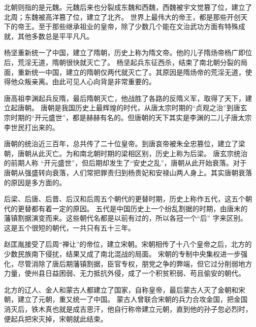\documentclass[avery5371,grid]{flashcards}
\begin{document}
{北朝则指的是元魏。元魏后来也分裂成东魏和西魏，西魏被宇文觉篡了位，建立了北周；东魏被高洋篡了位，建立了北齐。} %
{世界上最伟大的帝王，都是那些开创天下的帝王。至于那些继承祖业的皇帝，除了少数几个能在文治武功方面有特殊成就，其他多数总是平平凡凡。} %

{杨坚重新统一了中国，建立了隋朝，历史上称为隋文帝。他的儿子隋炀帝杨广即位后，荒淫无道，隋朝很快就灭亡了。} %
{杨坚起兵东征西杀，结束了南北朝分裂的局面，重新统一中国，建立的隋朝仅两代就灭亡了。其原因是隋炀帝的荒淫无道，使得他众叛亲离。由此可见人心向背是非常重要的。} %

{唐高祖李渊起兵反隋，最后隋朝灭亡，他战胜了各路的反隋义军，取得了天下，建立起唐朝。} %
{唐朝是我国历史上最辉煌的时代，从唐太宗时期的“贞观之治”到唐玄宗时期的“开元盛世”，都是赫赫有名的。但唐朝的天下其实是李渊的二儿子唐太宗李世民打出来的。} %

{唐朝的统治近三百年，总共传了二十位皇帝。到唐哀帝被朱全忠篡位，建立了梁朝，唐朝从此灭亡。为和南北朝时期的梁相区别，历史上称为后梁。} %
{唐玄宗统治的前期人称 “开元盛世”，但后期却发生了“安史之乱”，唐朝从此开始衰落。对于唐朝从强盛转向衰落，人们常把罪责归到杨贵妃和安禄山两人身上。其实唐朝衰落的原因是多方面的。} %

{后梁、后唐、后晋、后汉和后周五个朝代的更替时期，历史上称作五代，这五个朝代的更替都有着一定的原因。} %
{五代是中国历史上一个纷乱割据的时期，由唐末的藩镇割据演变而来。这些朝代名都是以前有过的，所以各冠一个“后” 字来区别。这是五个很短的朝代，一共只有五十三年。} %

{赵匡胤接受了后周“禅让”的帝位，建立宋朝。宋朝相传了十八个皇帝之后，北方的少数民族南下侵扰，结果又成了南北混战的局面。} %
{宋朝的专制中央集权进一步强化，尽管消除了唐后期藩镇割据，臣官专权，朋党之争的弊端，但它过分削弱地方力量，使州县日益困弱、无力抵抗外侵，成了一个积贫积弱、苟且偷安的朝代。} %



{北方的辽人、金人和蒙古人都建立了国家，自称皇帝，最后蒙古人灭了金朝和宋朝，建立了元朝，重又统一了中国。} %
{蒙古人曾联合宋朝的兵力合攻金国，把金国消灭后，铁木真也就是成吉思汗，他自行称帝建立元朝，直到他的孙子忽必烈时，便起兵把宋灭掉，宋朝就此结束。} %
\end{document}
